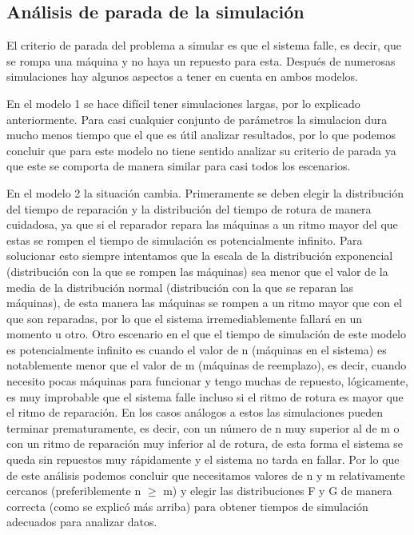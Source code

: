\documentclass[11pt]{article}
\begin{document}
    \subsection{Análisis de parada de la simulación}
    El criterio de parada del problema a simular es que el sistema falle, es decir, que se rompa una máquina y no haya un repuesto para esta. Después 
    de numerosas simulaciones hay algunos aspectos a tener en cuenta en ambos modelos.

    En el modelo 1 se hace difícil tener simulaciones largas, por lo explicado anteriormente. Para casi cualquier conjunto de parámetros la simulacion 
    dura mucho menos tiempo que el que es útil analizar resultados, por lo que podemos concluir que para este modelo no tiene sentido analizar su 
    criterio de parada ya que este se comporta de manera similar para casi todos los escenarios.

    En el modelo 2 la situación cambia. Primeramente se deben elegir la distribución del tiempo de reparación y la distribución del tiempo de rotura de 
    manera cuidadosa, ya que si el reparador repara las máquinas a un ritmo mayor del que estas se rompen el tiempo de simulación es potencialmente 
    infinito. Para solucionar esto siempre intentamos que la escala de la distribución exponencial (distribución con la que se rompen las máquinas) sea 
    menor que el valor de la media de la distribución normal (distribución con la que se reparan las máquinas), de esta manera las máquinas se rompen a 
    un ritmo mayor que con el que son reparadas, por lo que el sistema irremediablemente fallará en un momento u otro. Otro escenario en el que el tiempo 
    de simulación de este modelo es potencialmente infinito es cuando el valor de n (máquinas en el sistema) es notablemente menor que el valor de 
    m (máquinas de reemplazo), es decir, cuando necesito pocas máquinas para funcionar y tengo muchas de repuesto, lógicamente, es muy improbable que el 
    sistema falle incluso si el ritmo de rotura es mayor que el ritmo de reparación. En los casos análogos a estos las simulaciones pueden terminar 
    prematuramente, es decir, con un número de n muy superior al de m o con un ritmo de reparación muy inferior al de rotura, de esta forma el sistema se 
    queda sin repuestos muy rápidamente y el sistema no tarda en fallar. Por lo que de este análisis podemos concluir que necesitamos valores de n y m 
    relativamente cercanos (preferiblemente n $\geq$ m) y elegir las distribuciones F y G de manera correcta (como se explicó más arriba) para obtener tiempos 
    de simulación adecuados para analizar datos.
\end{document}
